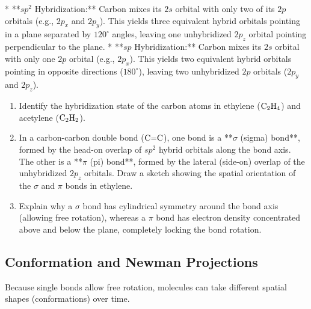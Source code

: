 \documentclass[12pt, a4paper]{book}
\begin{document}
\begin{explobox}
* **$sp^2$ Hybridization:** Carbon mixes its $2s$ orbital with only two of its $2p$ orbitals (e.g., $2p_x$ and $2p_y$). This yields three equivalent hybrid orbitals pointing in a plane separated by $120^\circ$ angles, leaving one unhybridized $2p_z$ orbital pointing perpendicular to the plane.
* **$sp$ Hybridization:** Carbon mixes its $2s$ orbital with only one $2p$ orbital (e.g., $2p_x$). This yields two equivalent hybrid orbitals pointing in opposite directions ($180^\circ$), leaving two unhybridized $2p$ orbitals ($2p_y$ and $2p_z$).

\begin{enumerate}[label=(\alph*), leftmargin=*]
  \item Identify the hybridization state of the carbon atoms in ethylene ($\ce{C2H4}$) and acetylene ($\ce{C2H2}$).
  \item In a carbon-carbon double bond ($\ce{C=C}$), one bond is a **$\sigma$ (sigma) bond**, formed by the head-on overlap of $sp^2$ hybrid orbitals along the bond axis. The other is a **$\pi$ (pi) bond**, formed by the lateral (side-on) overlap of the unhybridized $2p_z$ orbitals.
        Draw a sketch showing the spatial orientation of the $\sigma$ and $\pi$ bonds in ethylene.
  \item Explain why a $\sigma$ bond has cylindrical symmetry around the bond axis (allowing free rotation), whereas a $\pi$ bond has electron density concentrated above and below the plane, completely locking the bond rotation.
\end{enumerate}
\end{explobox}

\subsection{Conformation and Newman Projections}

Because single bonds allow free rotation, molecules can take different spatial shapes (conformations) over time.
\end{document}
